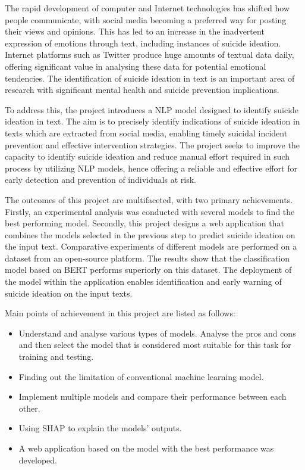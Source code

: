 \documentclass[ %
                    author={Bocheng Wang},
                supervisor={Dr. Qiang Liu},
                    degree={MSc},
                     title={A Research on Identification of Suicide Ideation in Texts with Multiple Models},
                      type={},
                      year={2024}]{dissertation}
\begin{document}
The rapid development of computer and Internet technologies has shifted how people communicate, with social media becoming a preferred way for posting their views and opinions. This has led to an increase in the inadvertent expression of emotions through text, including instances of suicide ideation. Internet platforms such as Twitter produce huge amounts of textual data daily, offering significant value in analysing these data for potential emotional tendencies. The identification of suicide ideation in text is an important area of research with significant mental health and suicide prevention implications.

To address this, the project introduces a NLP model designed to identify suicide ideation in text. The aim is to precisely identify indications of suicide ideation in texts which are extracted from social media, enabling timely suicidal incident prevention and effective intervention strategies. The project seeks to improve the capacity to identify suicide ideation and reduce manual effort required in such process by utilizing NLP models, hence offering a reliable and effective effort for early detection and prevention of individuals at risk.

The outcomes of this project are multifaceted, with two primary achievements. Firstly, an experimental analysis was conducted with several models to find the best performing model. Secondly, this project designs a web application that combines the models selected in the previous step to predict suicide ideation on the input text. Comparative experiments of different models are performed on a dataset from an open-source platform. The results show that the classification model based on BERT performs superiorly on this dataset. The deployment of the model within the application enables identification and early warning of suicide ideation on the input texts.

\bigskip

\noindent
Main points of achievement in this project are listed as follows:

\begin{itemize}
      \item Understand and analyse various types of models. Analyse the pros and cons and then select the model that is considered most suitable for this task for training and testing.
      \item Finding out the limitation of conventional machine learning model.
      \item Implement multiple models and compare their performance between each other.
      \item Using SHAP to explain the models' outputs.
      \item A web application based on the model with the best performance was developed.
\end{itemize}
\end{document}
